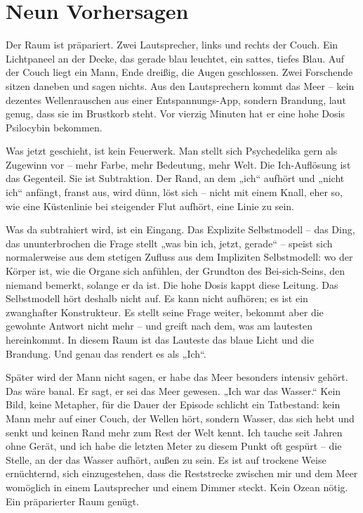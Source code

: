 \documentclass[11pt, twoside, openright]{book}
\begin{document}
\chapter{Neun Vorhersagen}

Der Raum ist präpariert. Zwei Lautsprecher, links und rechts der Couch. Ein Lichtpaneel an der Decke, das gerade blau leuchtet, ein sattes, tiefes Blau. Auf der Couch liegt ein Mann, Ende dreißig, die Augen geschlossen. Zwei Forschende sitzen daneben und sagen nichts. Aus den Lautsprechern kommt das Meer -- kein dezentes Wellenrauschen aus einer Entspannungs-App, sondern Brandung, laut genug, dass sie im Brustkorb steht. Vor vierzig Minuten hat er eine hohe Dosis Psilocybin bekommen.

Was jetzt geschieht, ist kein Feuerwerk. Man stellt sich Psychedelika gern als Zugewinn vor -- mehr Farbe, mehr Bedeutung, mehr Welt. Die Ich-Auflösung ist das Gegenteil. Sie ist Subtraktion. Der Rand, an dem „ich“ aufhört und „nicht ich“ anfängt, franst aus, wird dünn, löst sich -- nicht mit einem Knall, eher so, wie eine Küstenlinie bei steigender Flut aufhört, eine Linie zu sein.

Was da subtrahiert wird, ist ein Eingang. Das Explizite Selbstmodell -- das Ding, das ununterbrochen die Frage stellt „was bin ich, jetzt, gerade“ -- speist sich normalerweise aus dem stetigen Zufluss aus dem Impliziten Selbstmodell: wo der Körper ist, wie die Organe sich anfühlen, der Grundton des Bei-sich-Seins, den niemand bemerkt, solange er da ist. Die hohe Dosis kappt diese Leitung. Das Selbstmodell hört deshalb nicht auf. Es kann nicht aufhören; es ist ein zwanghafter Konstrukteur. Es stellt seine Frage weiter, bekommt aber die gewohnte Antwort nicht mehr -- und greift nach dem, was am lautesten hereinkommt. In diesem Raum ist das Lauteste das blaue Licht und die Brandung. Und genau das rendert es als „Ich“.

Später wird der Mann nicht sagen, er habe das Meer besonders intensiv gehört. Das wäre banal. Er sagt, er sei das Meer gewesen. „Ich war das Wasser.“ Kein Bild, keine Metapher, für die Dauer der Episode schlicht ein Tatbestand: kein Mann mehr auf einer Couch, der Wellen hört, sondern Wasser, das sich hebt und senkt und keinen Rand mehr zum Rest der Welt kennt. Ich tauche seit Jahren ohne Gerät, und ich habe die letzten Meter zu diesem Punkt oft gespürt -- die Stelle, an der das Wasser aufhört, außen zu sein. Es ist auf trockene Weise ernüchternd, sich einzugestehen, dass die Reststrecke zwischen mir und dem Meer womöglich in einem Lautsprecher und einem Dimmer steckt. Kein Ozean nötig. Ein präparierter Raum genügt.
\end{document}
